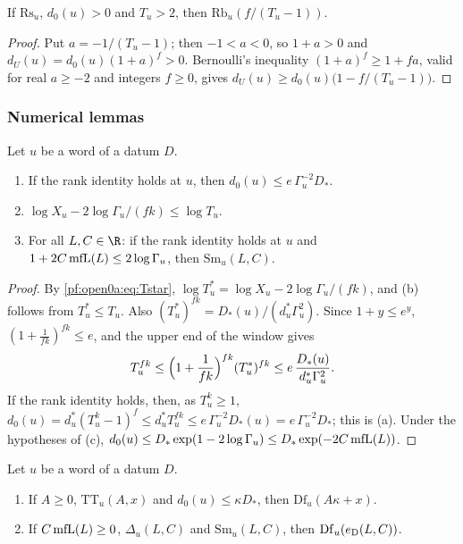 \begin{lemma}\label{pf:open0a:rambig}
If $\mathrm{Rs}_u$, $d_0(u)>0$ and $T_u>2$, then $\mathrm{Rb}_u(f/(T_u-1))$.
\end{lemma}

\begin{proof}
Put $a=-1/(T_u-1)$; then $-1<a<0$, so $1+a>0$ and $d_U(u)=d_0(u)(1+a)^f>0$. Bernoulli's inequality
$(1+a)^f\ge1+fa$, valid for real $a\ge-2$ and integers $f\ge0$, gives $d_U(u)\ge d_0(u)\bigl(1-f/(T_u-1)\bigr)$.
\end{proof}

\subsubsection{Numerical lemmas}

\begin{lemma}\label{pf:open0a:window}
Let $u$ be a word of a datum $D$.
\begin{enumerate}[label=(\alph*)]
\item If the rank identity holds at $u$, then $d_0(u)\le e\,\Gamma_u^{-2}D_*$.
\item $\log X_u-2\log\Gamma_u/(fk)\le\log T_u$.
\item For all $L,C\in\R$: if the rank identity holds at $u$ and $1+2C\operatorname{mfL}(L)\le2\log\Gamma_u$, then
$\mathrm{Sm}_u(L,C)$.
\end{enumerate}
\end{lemma}

\begin{proof}
By \eqref{pf:open0a:eq:Tstar}, $\log T_u^*=\log X_u-2\log\Gamma_u/(fk)$, and (b) follows from $T_u^*\le T_u$. Also
$(T_u^*)^{fk}=D_*(u)/(d_u^*\Gamma_u^2)$. Since $1+y\le e^y$, $(1+\frac1{fk})^{fk}\le e$, and the upper end of the
window gives
\[
T_u^{fk}\le\Bigl(1+\frac1{fk}\Bigr)^{fk}(T_u^*)^{fk}\le e\,\frac{D_*(u)}{d_u^*\Gamma_u^2}.
\]
If the rank identity holds, then, as $T_u^k\ge1$,
$d_0(u)=d_u^*(T_u^k-1)^f\le d_u^*T_u^{fk}\le e\,\Gamma_u^{-2}D_*(u)=e\,\Gamma_u^{-2}D_*$; this is (a). Under the
hypotheses of (c), $d_0(u)\le D_*\exp(1-2\log\Gamma_u)\le D_*\exp(-2C\operatorname{mfL}(L))$.
\end{proof}

\begin{lemma}\label{pf:open0a:diagcor}
Let $u$ be a word of a datum $D$.
\begin{enumerate}[label=(\alph*)]
\item If $A\ge0$, $\mathrm{TT}_u(A,x)$ and $d_0(u)\le\kappa D_*$, then $\mathrm{Df}_u(A\kappa+x)$.
\item If $C\operatorname{mfL}(L)\ge0$, $\Delta_u(L,C)$ and $\mathrm{Sm}_u(L,C)$, then $\mathrm{Df}_u(e_{\mathrm{D}}(L,C))$.
\end{enumerate}
\end{lemma}

